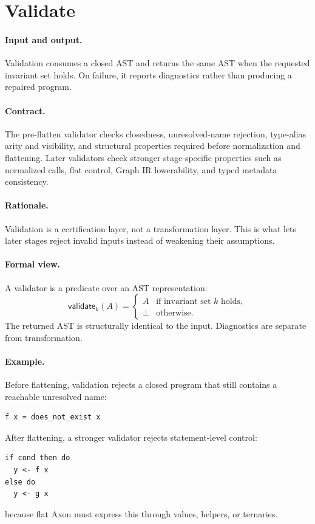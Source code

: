\section{Validate}

\paragraph{Input and output.}
Validation consumes a closed AST and returns the same AST when the requested
invariant set holds.  On failure, it reports diagnostics rather than producing
a repaired program.

\paragraph{Contract.}
The pre-flatten validator checks closedness, unresolved-name rejection,
type-alias arity and visibility, and structural properties required before
normalization and flattening.  Later validators check stronger stage-specific
properties such as normalized calls, flat control, Graph IR lowerability, and
typed metadata consistency.

\paragraph{Rationale.}
Validation is a certification layer, not a transformation layer.  This is what
lets later stages reject invalid inputs instead of weakening their assumptions.

\paragraph{Formal view.}
A validator is a predicate over an AST representation:
\[
  \mathsf{validate}_k(A) =
  \begin{cases}
  A & \text{if invariant set } k \text{ holds},\\
  \bot & \text{otherwise.}
  \end{cases}
\]
The returned AST is structurally identical to the input.  Diagnostics are
separate from transformation.

\paragraph{Example.}
Before flattening, validation rejects a closed program that still contains a
reachable unresolved name:
\begin{verbatim}
f x = does_not_exist x
\end{verbatim}
After flattening, a stronger validator rejects statement-level control:
\begin{verbatim}
if cond then do
  y <- f x
else do
  y <- g x
\end{verbatim}
because flat Axon must express this through values, helpers, or ternaries.
